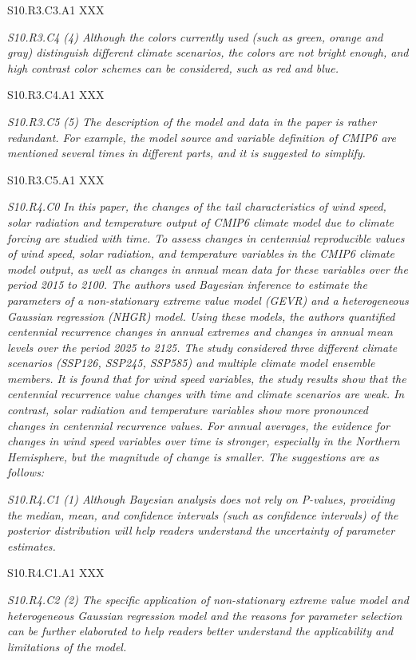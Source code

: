 \documentclass[a4paper,10pt]{article}
\begin{document}
	S10.R3.C3.A1 XXX

	\emph{S10.R3.C4 (4) Although the colors currently used (such as green, orange and gray) distinguish different climate scenarios, the colors are not bright enough, and high contrast color schemes can be considered, such as red and blue.}

	S10.R3.C4.A1 XXX

	\emph{S10.R3.C5 (5) The description of the model and data in the paper is rather redundant. For example, the model source and variable definition of CMIP6 are mentioned several times in different parts, and it is suggested to simplify.}

	S10.R3.C5.A1 XXX

	\emph{S10.R4.C0 In this paper, the changes of the tail characteristics of wind speed, solar radiation and temperature output of CMIP6 climate model due to climate forcing are studied with time. To assess changes in centennial reproducible values of wind speed, solar radiation, and temperature variables in the CMIP6 climate model output, as well as changes in annual mean data for these variables over the period 2015 to 2100. The authors used Bayesian inference to estimate the parameters of a non-stationary extreme value model (GEVR) and a heterogeneous Gaussian regression (NHGR) model. Using these models, the authors quantified centennial recurrence changes in annual extremes and changes in annual mean levels over the period 2025 to 2125. The study considered three different climate scenarios (SSP126, SSP245, SSP585) and multiple climate model ensemble members. It is found that for wind speed variables, the study results show that the centennial recurrence value changes with time and climate scenarios are weak. In contrast, solar radiation and temperature variables show more pronounced changes in centennial recurrence values. For annual averages, the evidence for changes in wind speed variables over time is stronger, especially in the Northern Hemisphere, but the magnitude of change is smaller. The suggestions are as follows:}

	\emph{S10.R4.C1 (1) Although Bayesian analysis does not rely on P-values, providing the median, mean, and confidence intervals (such as confidence intervals) of the posterior distribution will help readers understand the uncertainty of parameter estimates.}

	S10.R4.C1.A1 XXX

	\emph{S10.R4.C2 (2) The specific application of non-stationary extreme value model and heterogeneous Gaussian regression model and the reasons for parameter selection can be further elaborated to help readers better understand the applicability and limitations of the model.}
\end{document}
